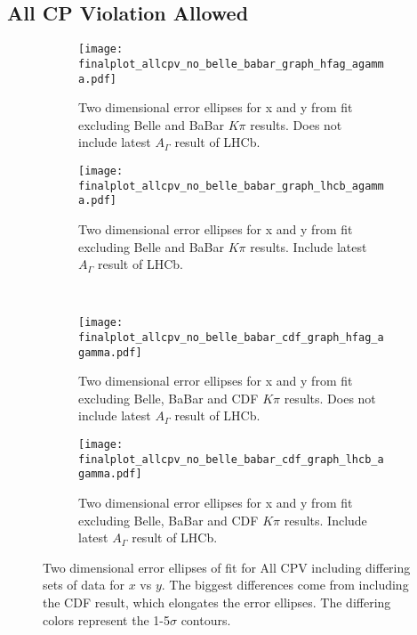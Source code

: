 \subsection{All CP Violation Allowed}

\begin{figure}[htb]
  \begin{center}
    \begin{subfigure}[b]{0.4\textwidth}
      \centering
      \texttt{[image: finalplot\_allcpv\_no\_belle\_babar\_graph\_hfag\_agamma.pdf]}
      \caption{Two dimensional error ellipses for x and y from fit excluding Belle and BaBar $K\pi$ results. Does not include latest $A_\Gamma$ result of LHCb.}
      \label{fig:xy_all_cpv_no_agamma}
    \end{subfigure}%
    \hspace{2mm}
    \begin{subfigure}[b]{0.4\textwidth}
      \centering
      \texttt{[image: finalplot\_allcpv\_no\_belle\_babar\_graph\_lhcb\_agamma.pdf]}
      \caption{Two dimensional error ellipses for x and y from fit excluding Belle and BaBar $K\pi$ results. Include latest $A_\Gamma$ result of LHCb.}
      \label{fig:xy_all_cpv_with_agamma}
    \end{subfigure}%
    \\
    \begin{subfigure}[b]{0.4\textwidth}
      \centering
      \texttt{[image: finalplot\_allcpv\_no\_belle\_babar\_cdf\_graph\_hfag\_agamma.pdf]}
      \caption{Two dimensional error ellipses for x and y from fit excluding Belle, BaBar and CDF $K\pi$ results. Does not include latest $A_\Gamma$ result of LHCb.}
      \label{fig:xy_all_cpv_no_agamma}
    \end{subfigure}%
    \hspace{2mm}
    \begin{subfigure}[b]{0.4\textwidth}
      \centering
      \texttt{[image: finalplot\_allcpv\_no\_belle\_babar\_cdf\_graph\_lhcb\_agamma.pdf]}
      \caption{Two dimensional error ellipses for x and y from fit excluding Belle, BaBar and CDF $K\pi$ results. Include latest $A_\Gamma$ result of LHCb.}
      \label{fig:xy_all_cpv_with_agamma}
    \end{subfigure}%
  \end{center}
  \caption{Two dimensional error ellipses of fit for All CPV including differing sets of data for $x$ vs $y$. The biggest differences come from including the CDF result, which elongates the error ellipses. The differing colors represent the 1-5$\sigma$ contours.}
  \label{fig:xy_all_variations}
\end{figure}

